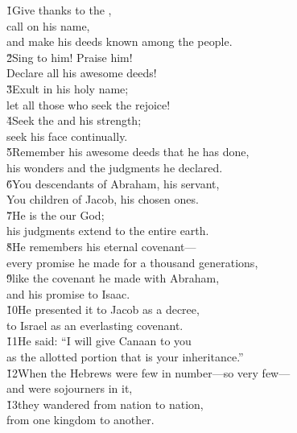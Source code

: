 \begin{poetry}
\poeml \v{1}Give thanks to the , \\
\poemll    call on his name, \\
\poemlll       and make his deeds known among the people. \\
\poeml \v{2}Sing to him! Praise him! \\
\poemll    Declare all his awesome deeds! \\
\poeml \v{3}Exult in his holy name; \\
\poemll    let all those who seek the  rejoice! \\
\poeml \v{4}Seek the  and his strength; \\
\poemll    seek his face continually. \\
\poeml \v{5}Remember his awesome deeds that he has done, \\
\poemll    his wonders and the judgments he declared. \\
\poeml \v{6}You descendants of Abraham, his servant, \\
\poemll    You children of Jacob, his chosen ones. \\
\poeml \v{7}He is the  our God; \\
\poemll    his judgments extend to the entire earth. \\
\poeml \v{8}He remembers his eternal covenant--- \\
\poemll    every promise he made for a thousand generations, \\
\poeml \v{9}like the covenant he made with Abraham, \\
\poemll    and his promise to Isaac. \\
\poeml \v{10}He presented it to Jacob as a decree, \\
\poemll    to Israel as an everlasting covenant. \\
\poeml \v{11}He said: ``I will give Canaan to you \\
\poemll    as the allotted portion that is your inheritance.'' \\
\poeml \v{12}When the Hebrews were few in number---so very few--- \\
\poemll    and were sojourners in it, \\
\poeml \v{13}they wandered from nation to nation, \\
\poemll    from one kingdom to another. \\

\end{poetry}
